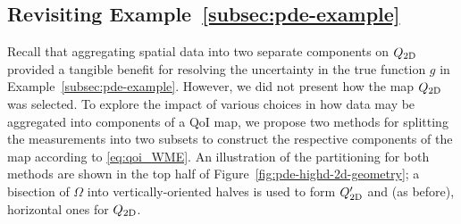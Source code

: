 \subsection{Revisiting Example~\ref{subsec:pde-example}}

Recall that aggregating spatial data into two separate components on $Q_\text{2D}$ provided a tangible benefit for resolving the uncertainty in the true function $g$ in Example~\ref{subsec:pde-example}.
However, we did not present how the map $Q_\text{2D}$ was selected.
To explore the impact of various choices in how data may be aggregated into components of a QoI map, we propose two methods for splitting the measurements into two subsets to construct the respective components of the map according to \eqref{eq:qoi_WME}.
An illustration of the partitioning for both methods are shown in the top half of Figure~\ref{fig:pde-highd-2d-geometry}; a bisection of $\Omega$ into vertically-oriented halves is used to form $Q_\text{2D}^\prime$ and (as before), horizontal ones for $Q_\text{2D}$.

